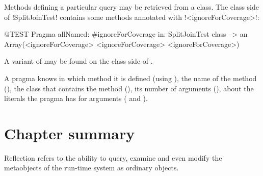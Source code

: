 \documentclass[a4paper,10pt,twoside]{book}
\begin{document}
{Methods defining a particular query may be retrieved from a class. The class side of \ct!SplitJoinTest! contains some methods annotated with \ct!<ignoreForCoverage>!:

\begin{code}{@TEST}
Pragma allNamed: #ignoreForCoverage in: SplitJoinTest class  --> an Array(<ignoreForCoverage> <ignoreForCoverage> <ignoreForCoverage>)
\end{code}

A variant of  may be found on the class side of .

A pragma knows in which method it is defined (using ), the name of the method (), the class that contains the method (), its number of arguments (), about the literals the pragma has for arguments ( and ). 


\section{Chapter summary}

Reflection refers to the ability to query, examine and even modify the metaobjects of the run-time system as ordinary objects.

}
\end{document}
